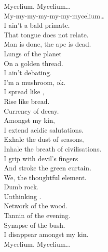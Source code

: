 
\label{album:ice-death-planets-mushrooms-lava}





Mycelium. Mycelium… \\
My-my-my-my-my-my-mycelium… \\

I ain't a bald primate. \\
That tongue does not relate. \\
Man is done, the ape is dead. \\
Lungs of the planet \\
On a golden thread. \\
I ain't debating. \\
I'm a mushroom, ok. \\
I spread like , \\
Rise like bread. \\
Currency of decay. \\

Amongst my kin, \\
I extend acidic salutations. \\
Exhale the dust of seasons, \\
Inhale the breath of civilisations. \\
I grip with devil's fingers \\
And stroke the green curtain. \\
We, the thoughtful element. \\

Dumb rock. \\
Unthinking . \\
Network of the wood. \\
Tannin of the evening. \\
Synapse of the bush. \\
I disappear amongst my kin. \\

Mycelium. Mycelium… \\


